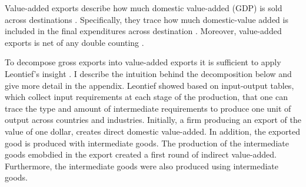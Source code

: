 Value-added exports describe how much domestic value-added (GDP) is sold across destinations \textcite{johnson}.
Specifically, they trace how much domestic-value added is included in the final expenditures across destination \textcite{Johnson2012}.
Moreover, value-added exports is net of any double counting \textcite{Koopman}.
\par
%
To decompose gross exports into value-added exports it is sufficient to apply Leontief's insight \textcite{wang2013}.
 I describe the intuition behind the decomposition below and give more detail in the appendix.
  Leontief showed based on input-output tables, which collect input requirements at each stage of the production, that one can trace the type and amount of intermediate  requirements to produce one unit of output across countries and industries.
 Initially, a firm producing an export of the value of one dollar, creates direct domestic value-added.
  In addition, the exported good is produced with intermediate goods.
  The production of the intermediate goods emobdied in the export created a first round of indirect value-added.
Furthermore, the intermediate goods were also produced using intermediate goods.
